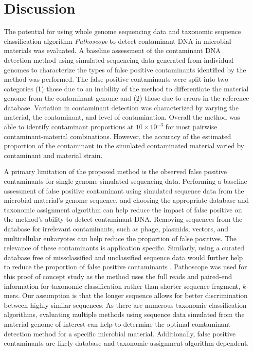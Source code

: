 \documentclass[fleqn,10pt,lineno]{wlpeerj}\usepackage[]{graphicx}\usepackage[]{color}
\begin{document}
\section*{Discussion}

The potential for using whole genome sequencing data and taxonomic sequence classification algorithm \textit{Pathoscope} to detect contaminant DNA in microbial materials was evaluated. 
A baseline assessment of the contaminant DNA detection method using simulated sequencing data generated from individual genomes to characterize the types of false positive contaminants identified by the method was performed. 
The false positive contaminants were split into two categories (1) those due to an inability of the method to differentiate the material genome from the contaminant genome and (2) those due to errors in the reference database. 
Variation in contaminant detection was characterized by varying the material, the contaminant, and level of contamination. 
Overall the method was able to identify contaminant proportions at $10 \times 10^{-3}$ for most pairwise contaminant-material combinations. 
However, the accuracy of the estimated proportion of the contaminant in the simulated contaminated material varied by contaminant and material strain. 

A primary limitation of the proposed method is the observed false positive contaminants for single genome simulated sequencing data. 
Performing a baseline assessment of false positive contaminant using simulated sequence data from the microbial material's genome sequence, 
and choosing the appropriate database and taxonomic assignment algorithm can help reduce the impact of false positive on the method's ability to detect contaminant DNA. 
Removing sequences from the database for irrelevant contaminants, such as phage, plasmids, vectors, and multicellular eukaryotes can help reduce the proportion of false positives. 
The relevance of these contaminants is application specific. 
Similarly, using a curated database free of missclassified and unclassified sequence data would further help to reduce the proportion of false positive contaminants \citep{tennessen2015prodege}. 
Pathoscope was used for this proof of concept study as the method uses the full reads and paired-end information for taxonomic classification rather than shorter sequence fragment, $k$-mers. 
Our assumption is that the longer sequence allows for better discrimination between highly similar sequences. 
As there are numerous taxonomic classification algorithms, evaluating multiple methods using sequence data simulated from the material genome of interest can help to determine the optimal comtaminant detection method for a specific microbial material. 
Additionally, false positive contaminants are likely database and taxonomic assignment algorithm dependent. 
\end{document}
